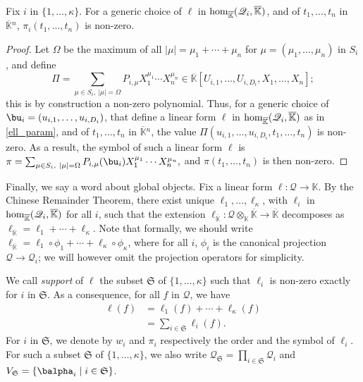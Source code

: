 \documentclass[12pt]{article}
\newcommand{\residueI}{\mathscr{Q}}
\def\dg{\kappa}
\def\K{\mathbb{K}}
\def\K {\ensuremath{\mathbb{K}}}
\def\Kbar {{\ensuremath{\overline{\mathbb{K}}}}}
\begin{document}
\begin{lemma}\label{lemma:symbol0}
  Fix $i$ in $\{1,\dots,\dg\}$. For a generic choice of $\ell$ in
  ${\rm hom}_\Kbar(\residueI_i,\Kbar)$, and of $t_1,\dots,t_n$ in $\Kbar{}^n$,
  $\pi_i(t_1,\dots,t_n)$ is non-zero.
\end{lemma}
\begin{proof}
  Let $\Omega$ be the maximum of all $|\mu|=\mu_1+\cdots+\mu_n$ for
  $\mu=(\mu_1,\dots,\mu_n)$ in $S_i$, and define 
	$$\Pi =\sum_{\mu \in S_i,\ |\mu|=\Omega}P_{i,\mu} X_1^{\mu_1}
  \cdots X_n^{\mu_n} \in
  \Kbar[U_{i,1},\dots,U_{i,D_i},X_1,\dots,X_n];$$ this is by
  construction a non-zero polynomial.  Thus, for a generic choice of
  $\bu_i=(u_{i,1},\dots,u_{i,D_i})$, that define a linear form
  $\ell$ in ${\rm hom}_\Kbar(\residueI_i,\Kbar)$ as in \cref{ell_param},
  and of $t_1,\dots,t_n$ in $\Kbar{}^n$, the value
  $\Pi(u_{i,1},\dots,u_{i,D_i},t_1,\dots,t_n)$ is non-zero. As a
  result, the symbol of such a linear form $\ell$ is $\pi
  =\sum_{\mu \in S_i,\ |\mu|=\Omega}P_{i,\mu}(\bu_i) X_1^{\mu_1}
  \cdots X_n^{\mu_n},$ and $\pi(t_1,\dots,t_n)$ is then non-zero.
\end{proof}

Finally, we say a word about global objects.  Fix a linear form $\ell:
\residueI \to \K$. By the Chinese Remainder Theorem, there exist unique
$\ell_1,\dots,\ell_\dg$, with $\ell_i$ in ${\rm hom}_\Kbar(\residueI_i,\Kbar)$
for all $i$, such that the extension $\ell_\Kbar: \residueI\otimes_\K \Kbar
\to \Kbar$ decomposes as $\ell_\Kbar = \ell_1 + \cdots + \ell_\dg$.
Note that formally, we should write 
$\ell_\Kbar = \ell_1 \circ \phi_1 + \cdots + \ell_\dg \circ \phi_\dg$,
where for all $i$, $\phi_i$ is the canonical projection $\residueI \to \residueI_i$;
we will however omit the projection operators for simplicity.

We
call {\em support} of $\ell$ the subset $\mathfrak{S}$ of
$\{1,\dots,\dg\}$ such that $\ell_i$ is non-zero exactly for $i$ in
$\mathfrak{S}$.  As a consequence, for all $f$ in $\residueI$, we have
\begin{align}\label{eq:fui}
\ell(f) &= \ell_1(f) + \cdots + \ell_\dg(f)\nonumber\\
&=  \sum_{i \in \mathfrak{S}} \ell_i(f).
\end{align}
For $i$ in $\mathfrak{S}$, we denote by $w_i$ and $\pi_i$ respectively
the order and the symbol of $\ell_i$. For such a subset $\mathfrak{S}$
of $\{1,\dots,\dg\}$, we also write $\residueI_\mathfrak{S}=\prod_{i
  \in \mathfrak{S}} \residueI_i$ and $V_\mathfrak{S}= \{\balpha_i \mid
i \in \mathfrak{S}\}$.
\end{document}
